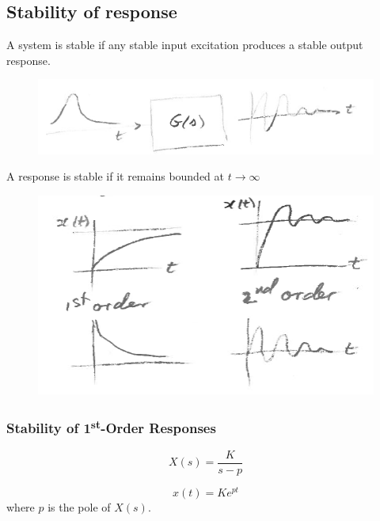 \documentclass[12pt,letter]{article}
\newtheorem{ex}{Example}
\numberwithin{ex}{section} %
\newenvironment{example}{\begin{mdframed}[middlelinewidth=0.5mm]\begin{ex}\normalfont}{\end{ex}\end{mdframed}}
\numberwithin{re}{section} %
\numberwithin{equation}{section}	%
\begin{document}
%

\subsection{Stability of response}


A system is stable if any stable input excitation produces a stable output response. 

\begin{figure}[H]
	\centering
	\includegraphics[width=5.5in]{../figures/stable_system_block_diagram}
\end{figure}

A response is stable if it remains bounded at $t \rightarrow \infty$

	\begin{figure}[H]
	\centering
	\includegraphics[width=4.5in]{../figures/stable_responses}
\end{figure}

\subsubsection{Stability of 1\textsuperscript{st}-Order Responses}

\begin{equation}
X(s) = \frac{K}{s-p}
\end{equation}

\begin{equation}
x(t) = K e ^{p t}
\end{equation}
where $p$ is the pole of $X(s)$. 
\end{document}
